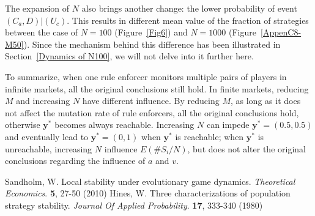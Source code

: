 \documentclass[letterpaper,10pt]{article}
\numberwithin{equation}{section}
\begin{document}
The expansion of $ N $ also brings another change: the lower probability of event $ (C_{a}, D)|(U_{c}) $. This results in different mean value of the fraction of strategies between the case of $ N = 100 $ (Figure~\ref{Fig6}) and $ N = 1000 $ (Figure~\ref{AppenC8-M50}). Since the mechanism behind this difference has been illustrated in Section~\ref{Dynamics of N100}, we will not delve into it further here.

To summarize, when one rule enforcer monitors multiple pairs of players in infinite markets, all the original conclusions still hold. In finite markets, reducing $ M $ and increasing $ N $ have different influence. By reducing $ M $, as long as it does not affect the mutation rate of rule enforcers, all the original conclusions hold, otherwise $ \mathbf{y}^* $ becomes always reachable. Increasing $ N $ can impede $ \mathbf{y}^* = (0.5, 0.5) $ and eventually lead to $ \mathbf{y}^* = (0, 1) $ when $ \mathbf{y}^* $ is reachable; when $ \mathbf{y}^* $ is unreachable, increasing $ N $ influence $ E(\# S_{i}/N) $, but does not alter the original conclusions regarding the influence of $ a $ and $ v $.


% 
\begin{thebibliography}{00}
Sandholm, W. Local stability under evolutionary game dynamics. {\em Theoretical Economics}. \textbf{5}, 27-50 (2010)
Hines, W. Three characterizations of population strategy stability. {\em Journal Of Applied Probability}. \textbf{17}, 333-340 (1980)
\end{thebibliography}
\end{document}
